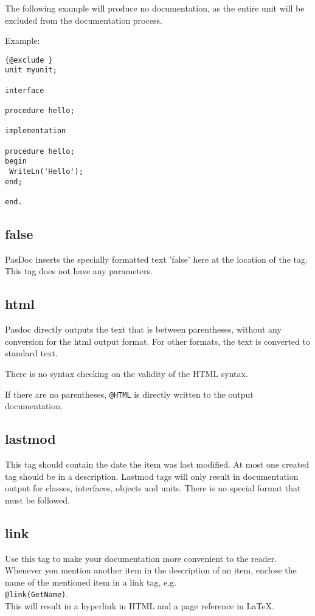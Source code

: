 \documentclass[11pt]{article}
\begin{document}
The following example will produce no documentation, as the entire unit
will be excluded from the documentation process.

Example:
\begin{verbatim}
{@exclude }
unit myunit;

interface

procedure hello;

implementation

procedure hello;
begin
 WriteLn('Hello');
end;

end.
\end{verbatim}


\subsection{false}
PasDoc inserts the specially formatted text 'false' here
at the location of the tag. This tag does not have any
parameters.

\subsection{html}
Pasdoc directly outputs the text that is between parentheses,
without any conversion for the html output format. For other 
formats, the text is converted to standard text. 

There is no syntax checking on the validity of the HTML syntax.

If there are no parentheses, {\tt @HTML} is directly written
to the output documentation.

\subsection{lastmod}

This tag should contain the date the item was last modified.
At most one created tag should be in a description.
Lastmod tags will only result in documentation output for
classes, interfaces, objects and units.
There is no special format that must be followed.

\subsection{link}

Use this tag to make your documentation more convenient to the reader.
Whenever you mention another item in the description of an item,
enclose the name of the mentioned item in a link tag, e.g.\\
{\tt @link(GetName)}.\\
This will result in a hyperlink in HTML and a page reference in
\LaTeX.
\end{document}
